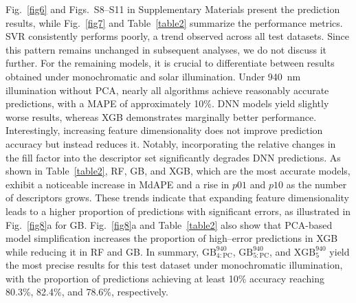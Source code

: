 \documentclass[a4paper,fleqn]{cas-sc}
\begin{document}
Fig.~\ref{fig6} and Figs.~S8--S11 in Supplementary Materials present the prediction results,
while Fig.~\ref{fig7} and Table~\ref{table2} summarize the performance metrics.
SVR consistently performs poorly, a trend observed across all test datasets.
Since this pattern remains unchanged in subsequent analyses, we do not discuss it further.
For the remaining models, it is crucial to differentiate between results obtained under monochromatic and solar illumination.
Under 940~nm illumination without PCA, nearly all algorithms achieve reasonably accurate predictions, with a MAPE of approximately 10\%.
DNN models yield slightly worse results, whereas XGB demonstrates marginally better performance.
Interestingly, increasing feature dimensionality does not improve prediction accuracy but instead reduces it.
Notably, incorporating the relative changes in the fill factor into the descriptor set significantly degrades DNN predictions.
As shown in Table~\ref{table2}, RF, GB, and XGB, which are the most accurate models, exhibit a noticeable increase
in MdAPE and a rise in $p01$ and $p10$ as the number of descriptors grows.
These trends indicate that expanding feature dimensionality leads to a higher proportion of predictions with significant errors,
as illustrated in Fig.~\ref{fig8}a for GB.
Fig.~\ref{fig8}a and Table~\ref{table2} also show that PCA-based model simplification increases the proportion of high--error predictions
in XGB while reducing it in RF and GB.
In summary, $\mathrm{GB}^{940}_\mathrm{4:PC}$, $\mathrm{GB}^{940}_\mathrm{5:PC}$,
and $\mathrm{XGB}^{940}_5$ yield the most precise results for this test dataset under monochromatic illumination,
with the proportion of predictions achieving at least 10\% accuracy reaching 80.3\%, 82.4\%, and 78.6\%, respectively.
\end{document}

